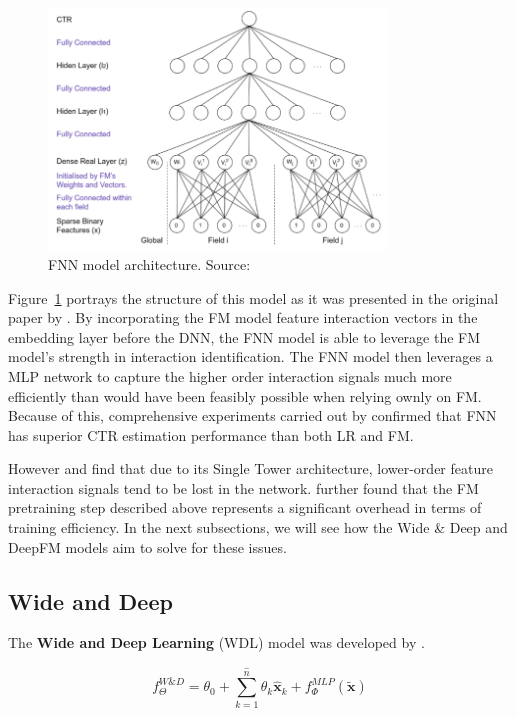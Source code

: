\documentclass{mldsmsc}
\begin{document}
\begin{figure}[h]
    \centering
    \includegraphics[width=0.8\textwidth]{../figures/fnn.png}
    \caption{FNN model architecture. Source: \citep{RefWorks:zhang2016deep}}
    \label{fig:fnn}
\end{figure}
Figure~\ref{fig:fnn} portrays the structure of this model as it was presented in the original
paper by \cite{RefWorks:zhang2016deep}.
By incorporating the FM model feature interaction vectors in the embedding layer
before the DNN, the FNN model is able to leverage the FM model's strength in
interaction identification. The FNN model then leverages a MLP network
to capture the higher order interaction signals much more efficiently than would
have been feasibly possible when relying ownly on FM. Because of this, comprehensive
experiments carried out by \cite{RefWorks:zhang2016deep} confirmed that FNN
has superior CTR estimation performance than both LR and FM.

However \cite{RefWorks:guo2017deepfm:} and \cite{RefWorks:zhang2021deep} find that
due to its Single Tower architecture, lower-order feature interaction signals tend
to be lost in the network. \cite{RefWorks:guo2017deepfm:} further found that
the FM pretraining step described above represents a significant overhead in
terms of training efficiency. In the next subsections, we will see how the Wide \& Deep
and DeepFM models aim to solve for these issues.

\subsection{Wide and Deep}

The \textbf{Wide and Deep Learning} (WDL) model was developed by \cite{RefWorks:cheng2016wide}.

\begin{equation*}
    f_{\Theta}^{W\&D} = \theta_0 + \sum_{k=1}^{\hat{n}} \theta_k \hat{\mathbf{x}}_k
    + f_{\Phi}^{MLP}(\tilde{\mathbf{x}})
\end{equation*}
\end{document}
